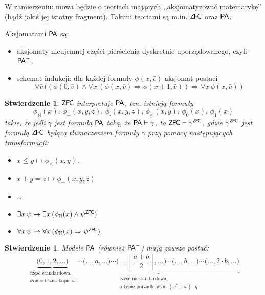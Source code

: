 \documentclass{article}
\newcommand{\N}{\mathbb{N}}
\theoremstyle{plain}
\newtheorem{stw}[thm]{Stwierdzenie}
\theoremstyle{definition}
\theoremstyle{remark}
\newcommand{\PA}{\mathsf{P \mkern-1.9mu A}}
\newcommand{\ZFC}{\mathsf{Z \mkern-1.6mu F \mkern-1.5mu C}}
\begin{document}
W zamierzeniu: mowa będzie o teoriach mających ,,aksjomatyzować matematykę''
(bądź jakiś jej istotny fragment). Takimi teoriami są m.in. $\ZFC$ oraz $\PA$.

Aksjomatami $\PA$ są:
\begin{itemize}
	\item aksjomaty nieujemnej części pierścienia dyskretnie
		uporządowanego, czyli $\PA^-$,
	\item schemat indukcji: dla każdej formuły $\phi(x, \bar{v})$ aksjomat
		postaci
		\[
			\forall \bar{v} \, ((\phi(0, \bar{v}) \wedge \forall x
			\, (\phi(x, \bar{v}) \Rightarrow \phi(x+1,
			\bar{v}))\Rightarrow \forall x \, \phi(x, \bar{v}))
		\]
\end{itemize}

\begin{stw}
	$\ZFC$ interpretuje $\PA$, tzn. istnieją formuły
	\[
		\phi_{\N}(x),\, \phi_+(x, y, z),\, \phi_{\cdot}(x, y, z),\,
		\phi_{\leq}(x, y),\, \phi_0(x),\, \phi_1(x)
	\]
	takie, że jeśli $\gamma$ jest formułą $\PA$ taką, że $\PA \vdash
	\gamma$, to $\ZFC \vdash \gamma^{\ZFC}$, gdzie $\gamma^{\ZFC}$ jest
	formułą $\ZFC$ będącą tłumaczeniem formuły $\gamma$ przy pomocy
	następujących transformacji:
	\begin{itemize}
		\item $x \leq y \mapsto \phi_{\leq}(x, y)$,
		\item $x + y = z \mapsto \phi_{+}(x, y, z)$
		\item \ldots
		\item $\exists x \, \psi \mapsto \exists x \, (\phi_{\N}(x)
			\wedge \psi^{\ZFC}) $
		\item $\forall x \, \psi \mapsto \forall x \, (\phi_{\N}(x)
			\Rightarrow \psi^{\ZFC}) $
	\end{itemize}

\end{stw}
\begin{stw}
	\label{stw:model_pa}
	Modele $\PA$ (również $\PA^-$) mają zawsze postać:
	\[ \underbrace{\big(0, 1, 2, \ldots\big)}_{\substack{\text{część
	standardowa,} \\ \text{izomorficzna kopia } \omega}}
\underbrace{\cdots \big(\ldots, a , \ldots\big)\cdots\big(\ldots,
	\left\lfloor\frac {a + b}{2}\right\rfloor, \ldots\big) \cdots
\big(\ldots, b, \ldots\big)\cdots\big(\ldots, 2\cdot b,
	\ldots\big)}_{\substack{\text{część niestandardowa,}\\
	\text{o typie porządkowym }(\omega^{\ast} + \omega) \cdot \eta}} \]

\end{stw}
\end{document}
